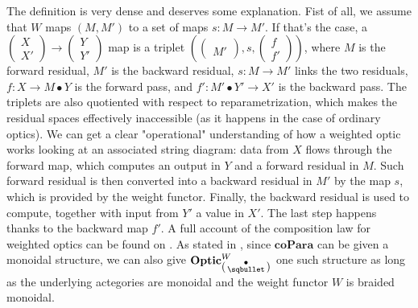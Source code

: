 \documentclass[11pt,a4paper,openright,twoside]{report}
\theoremstyle{plain}
\theoremstyle{definition}
\begin{document}
The definition is very dense and deserves some explanation. Fist of all, we assume that $W$ maps $(M,M')$ to a set of maps $s: M \to M'$. If that's the case, a $\left(\begin{smallmatrix}X\\X'\end{smallmatrix}\right) \to \left(\begin{smallmatrix}Y\\Y'\end{smallmatrix}\right)$ map is a triplet $\left(\left(\begin{smallmatrix}\\M'\end{smallmatrix}\right),s,\left(\begin{smallmatrix}f\\f'\end{smallmatrix}\right)\right)$, where $M$ is the forward residual, $M'$ is the backward residual, $s: M \to M'$ links the two residuals, $f: X \to M \bullet Y$ is the forward pass, and $f': M' \bullet Y' \to X'$ is the backward pass.
The triplets are also quotiented with respect to reparametrization, which makes the residual spaces effectively inaccessible (as it happens in the case of ordinary optics). We can get a clear "operational" understanding of how a weighted optic works looking at an associated string diagram: data from $X$ flows through the forward map, which computes an output in $Y$ and a forward residual in $M$. Such forward residual is then converted into a backward residual in $M'$ by the map $s$, which is provided by the weight functor. Finally, the backward residual is used to compute, together with input from $Y'$ a value in $X'$. The last step happens thanks to the backward map $f'$. A full account of the composition law for weighted optics can be found on \cite{gavranovic2024fundamental}.
As stated in \cite{gavranovic2024fundamental}, since $\mathbf{coPara}$ can be given a monoidal structure, we can also give $\mathbf{Optic}^W_{\left(\begin{smallmatrix}\bullet\\\sqbullet\end{smallmatrix}\right)}$ one such structure as long as the underlying actegories are monoidal and the weight functor $W$ is braided monoidal.
\end{document}
